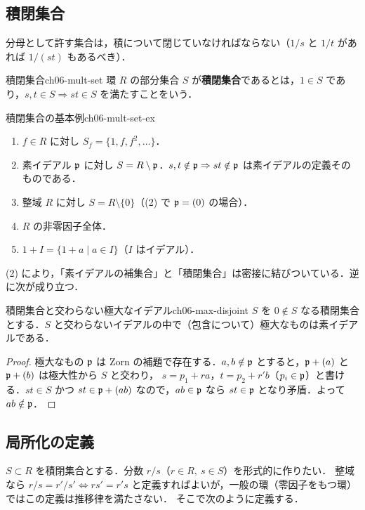 \subsection{積閉集合}

分母として許す集合は，積について閉じていなければならない（$1/s$ と $1/t$ があれば $1/(st)$ もあるべき）．

\begin{mydef}{積閉集合}{ch06-mult-set}
環 $R$ の部分集合 $S$ が\textbf{積閉集合}であるとは，$1\in S$ であり，$s,t\in S\Rightarrow st\in S$ を満たすことをいう．
\end{mydef}

\begin{myex}{積閉集合の基本例}{ch06-mult-set-ex}
\begin{enumerate}
  \item $f\in R$ に対し $S_f=\{1,f,f^2,\dots\}$．
  \item 素イデアル $\mathfrak{p}$ に対し $S=R\setminus\mathfrak{p}$．$s,t\notin\mathfrak{p}\Rightarrow st\notin\mathfrak{p}$ は素イデアルの定義そのものである．
  \item 整域 $R$ に対し $S=R\setminus\{0\}$（(2) で $\mathfrak{p}=(0)$ の場合）．
  \item $R$ の非零因子全体．
  \item $1+I=\{1+a\mid a\in I\}$（$I$ はイデアル）．
\end{enumerate}
\end{myex}

(2) により，「素イデアルの補集合」と「積閉集合」は密接に結びついている．逆に次が成り立つ．

\begin{mylem}{積閉集合と交わらない極大なイデアル}{ch06-max-disjoint}
$S$ を $0\notin S$ なる積閉集合とする．$S$ と交わらないイデアルの中で（包含について）極大なものは素イデアルである．
\end{mylem}

\begin{proof}
極大なもの $\mathfrak{p}$ は Zorn の補題で存在する．$a,b\notin\mathfrak{p}$ とすると，$\mathfrak{p}+(a)$ と $\mathfrak{p}+(b)$ は極大性から $S$ と交わり，
$s=p_1+ra$，$t=p_2+r'b$（$p_i\in\mathfrak{p}$）と書ける．$st\in S$ かつ $st\in\mathfrak{p}+(ab)$ なので，$ab\in\mathfrak{p}$ なら $st\in\mathfrak{p}$ となり矛盾．よって $ab\notin\mathfrak{p}$．
\end{proof}

\subsection{局所化の定義}

$S\subset R$ を積閉集合とする．分数 $r/s$（$r\in R,\ s\in S$）を形式的に作りたい．
整域なら $r/s=r'/s'\iff rs'=r's$ と定義すればよいが，一般の環（零因子をもつ環）ではこの定義は推移律を満たさない．
そこで次のように定義する．

